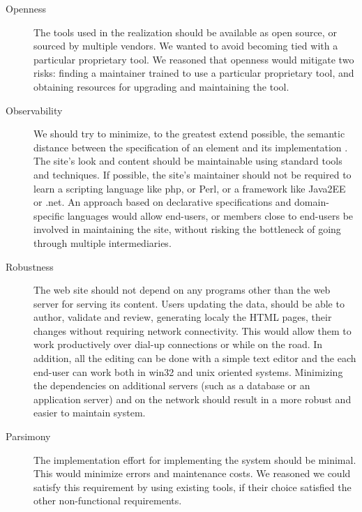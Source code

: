 \documentclass[10pt]{article}
\begin{document}
\begin{description}
\item[Openness] The tools used in the realization
should be available as open source, or sourced by multiple vendors.
We wanted to avoid becoming tied with a particular proprietary
tool.
We reasoned that openness would mitigate two risks:
finding a maintainer trained to use a particular proprietary tool,
and obtaining resources for upgrading and maintaining the tool.

\item[Observability]
We should try to minimize,
to the greatest extend possible, the semantic distance between
the specification of an element and its implementation \cite{SG97}.
The site's look and content should be maintainable
using standard tools and techniques.
If possible, the site's maintainer should not be required to
learn a scripting language like {\sc php}, or Perl, or
a framework like Java2EE or {\sc .net}.
An approach based on declarative specifications and
domain-specific languages would allow end-users, or members
close to end-users be involved in maintaining the site,
without risking the bottleneck of going through
multiple intermediaries.

\item[Robustness] The web site should not depend on
any programs other than the web server for serving
its content.
Users updating the data, should be able to author, validate and 
review, generating localy the HTML pages, 
their changes without requiring network connectivity.
This would allow them to work productively over dial-up connections
or while on the road. In addition, all the editing can be done with 
a simple text editor and the each end-user can work both in win32 and unix oriented systems.
Minimizing the dependencies on additional servers (such as a
database or an application server) and on the network
should result in a more robust and easier to maintain system.   

\item[Parsimony] The implementation effort for
implementing the system should be minimal.
This would minimize errors and maintenance costs.
We reasoned we could satisfy this requirement by
using existing tools, if their choice satisfied the
other non-functional requirements.

\end{description} 
\end{document}
